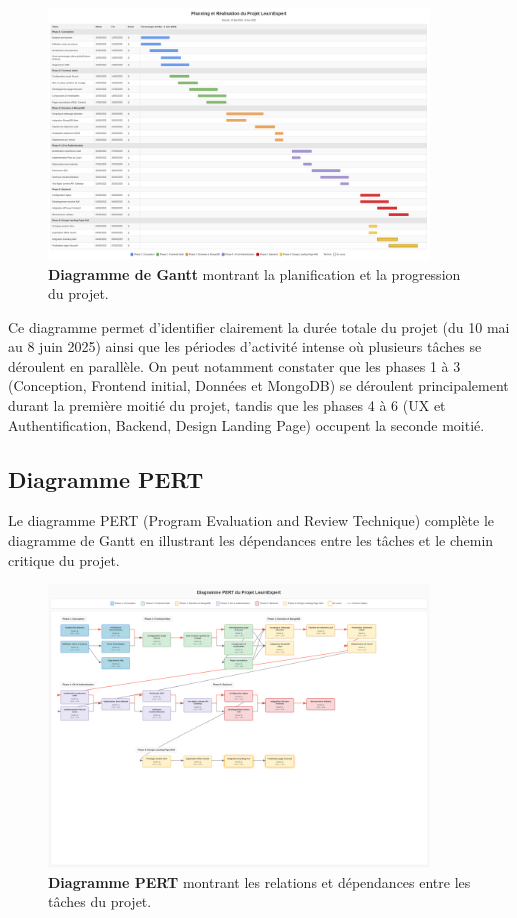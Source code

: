 \begin{figure}[p]
  \centering
  \includegraphics[width=0.9\textwidth,keepaspectratio]{images/gestion_projet/gantt_diagram.png}
  \caption{\textbf{Diagramme de Gantt} montrant la planification et la progression du projet.}
  \label{fig:gantt_diagram}
\end{figure}

Ce diagramme permet d'identifier clairement la durée totale du projet (du 10 mai au 8 juin 2025) ainsi que les périodes d'activité intense où plusieurs tâches se déroulent en parallèle. On peut notamment constater que les phases 1 à 3 (Conception, Frontend initial, Données et MongoDB) se déroulent principalement durant la première moitié du projet, tandis que les phases 4 à 6 (UX et Authentification, Backend, Design Landing Page) occupent la seconde moitié.

\clearpage

\subsection{Diagramme PERT}
Le diagramme PERT (Program Evaluation and Review Technique) complète le diagramme de Gantt en illustrant les dépendances entre les tâches et le chemin critique du projet.

\begin{figure}[p]
  \centering
  \includegraphics[width=0.9\textwidth,keepaspectratio]{images/gestion_projet/pert_diagram.png}
  \caption{\textbf{Diagramme PERT} montrant les relations et dépendances entre les tâches du projet.}
  \label{fig:pert_diagram}
\end{figure}

